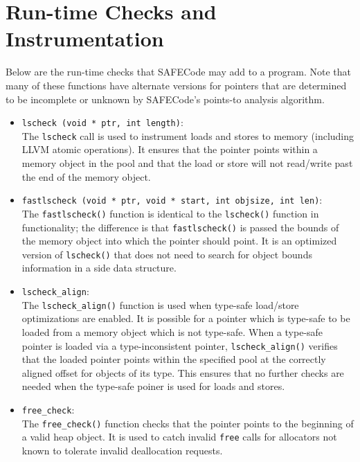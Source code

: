 \section{Run-time Checks and Instrumentation}
\label{section:checks}

Below are the run-time checks that SAFECode may add to a program.
Note that many of these functions have alternate versions for pointers
that are determined to be incomplete or unknown by SAFECode's
points-to analysis algorithm.

\begin{itemize}
\item{\tt lscheck (void * ptr, int length)}: \\
The {\tt lscheck} call is used to instrument loads and stores to
memory (including LLVM atomic operations).  It ensures that the
pointer points within a memory object in the pool and that the load or
store will not read/write past the end of the memory object.

\item{\tt fastlscheck (void * ptr, void * start, int objsize, int
len)}: \\
The {\tt fastlscheck()} function is identical to the {\tt lscheck()}
function in functionality; the difference is that {\tt fastlscheck()}
is passed the bounds of the memory object into which the pointer
should point.  It is an optimized version of {\tt lscheck()} that
does not need to search for object bounds information in a side data
structure.

\item{\tt lscheck\_align}: \\
The {\tt lscheck\_align()} function is used when type-safe
load/store optimizations are enabled.  It is possible for a pointer which
is type-safe to be loaded from a memory object which is not type-safe.
When a type-safe pointer is loaded via a type-inconsistent pointer,
{\tt lscheck\_align()} verifies that the loaded pointer points
within the specified pool at the correctly aligned offset for objects
of its type.  This ensures that no further checks are needed when the
type-safe poiner is used for loads and stores.

\item{\tt free\_check}: \\
The {\tt free\_check()} function checks that the pointer points to
the beginning of a valid heap object.  It is used to catch invalid
{\tt free} calls for allocators not known to tolerate invalid
deallocation requests.


\end{itemize}
